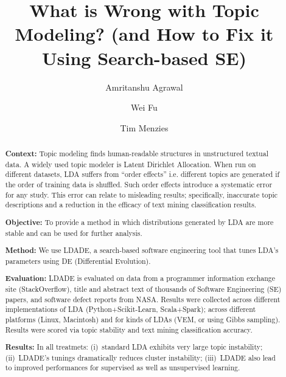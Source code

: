 \documentclass[twocolumn,5p,sort&compress]{elsarticle}
\theoremstyle{break}
\begin{document}
\begin{frontmatter}

\title{What is  Wrong with
Topic Modeling? (and How to Fix it Using Search-based SE)}



\author[label1]{Amritanshu Agrawal}
\address[label1]{Department of Computer Science, North Carolina State University, Raleigh, NC, USA}



\author[label1]{Wei Fu}

\author[label1]{Tim Menzies}

\begin{abstract}

\noindent \textbf{Context:} Topic modeling finds
  human-readable structures in unstructured textual data. A
  widely used topic modeler is Latent Dirichlet Allocation. When
  run on different datasets, LDA suffers from ``order effects''
  i.e.
 different topics are generated if the order of training data is shuffled.
  Such order effects introduce a
 systematic error for any study. This error can relate to misleading results;
  specifically, inaccurate topic descriptions and a reduction in the efficacy of
  text mining classification results.

 \noindent
\textbf{Objective:} To provide a method in which distributions
generated by LDA are more stable and can be used for further analysis.

 \noindent
\textbf{Method:} We use LDADE, a search-based software engineering tool that tunes LDA's parameters using DE 
(Differential Evolution).

\noindent
\textbf{Evaluation:} 
LDADE is evaluated on data from a programmer
information exchange site (StackOverflow), title and abstract text of thousands
of Software Engineering (SE) papers, and software defect reports from NASA. Results were collected
across different implementations of LDA (Python+Scikit-Learn, Scala+Spark); across
different platforms (Linux, Macintosh) and for kinds of LDAs (VEM, or using Gibbs sampling). 
Results were scored via topic stability and text mining classification accuracy.

\noindent
\textbf{Results:}
In all treatmets:
   (i)~standard LDA exhibits very large topic instability;
  (ii)~LDADE's tunings dramatically reduces cluster instability; 
  (iii)~LDADE also lead to  improved performances for supervised as well as unsupervised learning.


\end{abstract}
\end{frontmatter}
\end{document}
